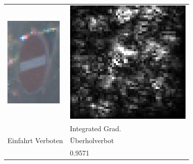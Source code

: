 \begin{table}
\begin{tabular}{p{4.5cm}p{4.5cm}}
		\includegraphics[height=4.4cm]{Images/AnPe/06848} &\includegraphics[width=\linewidth]{Images/AnPe/06848_s_int}  \\
		& Integrated Grad.\\
		Einfahrt Verboten & Überholverbot\\
		& 0.9571\\

\end{tabular}
\end{table}
